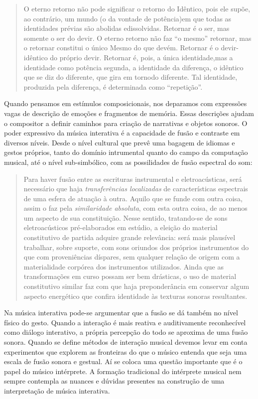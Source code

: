 \documentclass[draft]{ppgmus}
\begin{document}
\begin{quote}
O eterno retorno não pode significar o retorno do Idêntico, pois ele supõe, 
ao contrário, um mundo (o da vontade de potência)em que todas as identidades 
prévias são abolidas edissolvidas. Retornar é o ser, mas somente o ser do devir. 
O eterno retorno não faz “o mesmo” retornar, mas o retornar constitui o único 
Mesmo do que devém. Retornar é o devir-idêntico do próprio devir. Retornar é, 
pois, a única identidade,mas a identidade como potência segunda, a identidade da 
diferença, o idêntico que se diz do diferente, que gira em tornodo diferente. 
Tal identidade, produzida pela diferença, é determinada como “repetição”. \cite{ferraz1998musica}
\end{quote}


Quando pensamos em estímulos composicionais, nos deparamos com expressões
vagas de descrição de emoções e fragmentos de memória. Essas descrições
ajudam o compositor a definir caminhos para criação de narrativas e 
objetos sonoros. O poder expressivo da música interativa é a capacidade
de fusão e contraste em diversos níveis. Desde o nível cultural que prevê
uma bagagem de idiomas e gestos próprios, tanto do domínio intrumental quanto
do campo da computação musical, até o nível sub-simbólico, com as possilidades
de fusão espectral do som:

\begin{quote}

Para haver fusão entre as escrituras instrumental e eletroacústicas,
será necessário que haja \textit{transferências localizadas} de 
características espectrais de uma esfera de atuação à outra.
Aquilo que se funde com outra coisa, assim o faz pela \textit{similaridade
absoluta}, com esta outra coisa, de ao menos um aspecto de sua 
constituição. Nesse sentido, tratando-se de sons eletroacústicos 
pré-elaborados em estúdio, a eleição do material constitutivo de partida
adquire grande relevância: será mais plausível trabalhar, sobre suporte,
com sons oriundos dos próprios instrumentos do que com proveniências
díspares, sem qualquer relação de origem com a materialidade corpórea
dos instrumentos utilizados. Ainda que as transformações em curso possam ser
bem drásticas, o uso de material constitutivo similar faz com que
haja preponderância em conservar algum aspecto energético que confira
identidade às texturas sonoras resultantes. \cite{menezes2006musica}
\end{quote}


Na música interativa pode-se argumentar que a fusão se dá também no nível
físico do gesto. Quando a interação é mais reativa e auditivamente reconhecível
como diálogo interativo, a própria percepção do todo se aproxima de uma
fusão sonora. Quando se define métodos de interação musical devemos levar
em conta experimentos que explorem as fronteiras do que o músico entenda
que seja uma escala de fusão sonora e gestual. Aí se coloca uma questão
importante que é o papel do músico intérprete. A formação tradicional
do intérprete musical nem sempre contempla as nuances e dúvidas presentes na construção
de uma interpretação de música interativa. 
\end{document}
